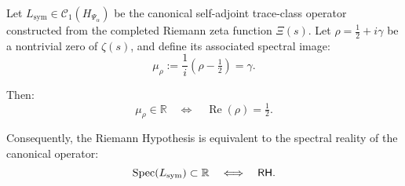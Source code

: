 \begin{lemma}
\label{lem:reality_of_spectrum_and_rh}

Let \( L_{\mathrm{sym}} \in \mathcal{C}_1(H_{\Psi_\alpha}) \) be the canonical self-adjoint trace-class operator constructed from the completed Riemann zeta function \( \Xi(s) \). Let \( \rho = \tfrac{1}{2} + i\gamma \) be a nontrivial zero of \( \zeta(s) \), and define its associated spectral image:
\[
\mu_\rho := \frac{1}{i}(\rho - \tfrac{1}{2}) = \gamma.
\]

Then:
\[
\mu_\rho \in \mathbb{R} \quad \Longleftrightarrow \quad \operatorname{Re}(\rho) = \tfrac{1}{2}.
\]

\medskip

\noindent
Consequently, the Riemann Hypothesis is equivalent to the spectral reality of the canonical operator:
\[
\operatorname{Spec}(L_{\mathrm{sym}}) \subset \mathbb{R} \quad \Longleftrightarrow \quad \mathsf{RH}.
\]
\end{lemma}
